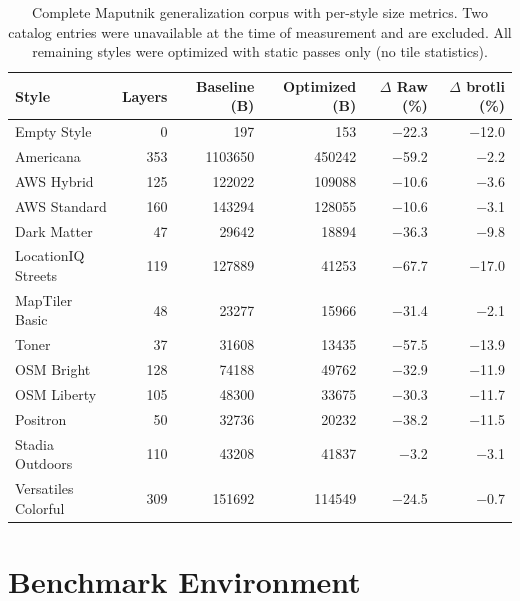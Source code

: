 \begin{table}[htbp]
\centering
\small
\begin{tabular}{l r r r r r}
\toprule
\textbf{Style} & \textbf{Layers} & \textbf{Baseline (B)} & \textbf{Optimized (B)} & \textbf{$\Delta$ Raw (\%)} & \textbf{$\Delta$ brotli (\%)} \\
\midrule
Empty Style          &   0 &           197 &           153 & \num{-22.3} & \num{-12.0} \\
Americana            & 353 & \num{1103650} &    \num{450242} & \num{-59.2} &  \num{-2.2} \\
AWS Hybrid           & 125 &    \num{122022} &    \num{109088} & \num{-10.6} &  \num{-3.6} \\
AWS Standard         & 160 &    \num{143294} &    \num{128055} & \num{-10.6} &  \num{-3.1} \\
Dark Matter          &  47 &     \num{29642} &     \num{18894} & \num{-36.3} &  \num{-9.8} \\
LocationIQ Streets   & 119 &    \num{127889} &     \num{41253} & \num{-67.7} & \num{-17.0} \\
MapTiler Basic       &  48 &     \num{23277} &     \num{15966} & \num{-31.4} &  \num{-2.1} \\
Toner                &  37 &     \num{31608} &     \num{13435} & \num{-57.5} & \num{-13.9} \\
OSM Bright           & 128 &     \num{74188} &     \num{49762} & \num{-32.9} & \num{-11.9} \\
OSM Liberty          & 105 &     \num{48300} &     \num{33675} & \num{-30.3} & \num{-11.7} \\
Positron             &  50 &     \num{32736} &     \num{20232} & \num{-38.2} & \num{-11.5} \\
Stadia Outdoors      & 110 &     \num{43208} &     \num{41837} &  \num{-3.2} &  \num{-3.1} \\
Versatiles Colorful  & 309 &    \num{151692} &    \num{114549} & \num{-24.5} &  \num{-0.7} \\
\bottomrule
\end{tabular}
\caption{
Complete Maputnik generalization corpus with per-style size metrics.
Two catalog entries were unavailable at the time of measurement and are excluded.
All remaining styles were optimized with static passes only (no tile statistics).}
\label{tab:maputnik_full}
\end{table}

\clearpage
\section{Benchmark Environment}\label{app:bench_env}

